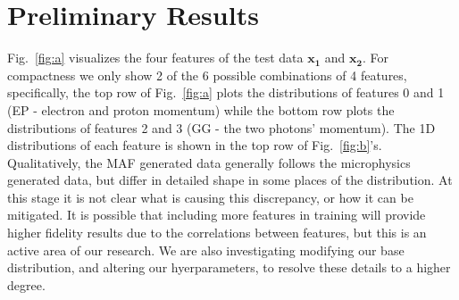 
\iffalse
\section{Preliminary Results}
Fig.~\ref{fig:a} visualizes the four features of the test data $\mathbf{x_1}$ and $\mathbf{x_2}$. For compactness we only show 2 of the 6 possible combinations of 4 features, specifically, the top row of  Fig.~\ref{fig:a} plots the distributions of features 0 and 1 (EP - electron and proton momentum) while the bottom row plots the distributions of features 2 and 3 (GG - the two photons' momentum). The 1D distributions of each feature is shown in the top row of Fig.~\ref{fig:b}'s. Qualitatively, the MAF generated data generally follows the microphysics generated data, but differ in detailed shape in some places of the distribution. At this stage it is not clear what is causing this discrepancy, or how it can be mitigated. It is possible that including more features in training will provide higher fidelity results due to the correlations between features, but this is an active area of our research. We are also investigating modifying our base distribution, and altering our hyerparameters, to resolve these details to a higher degree.

